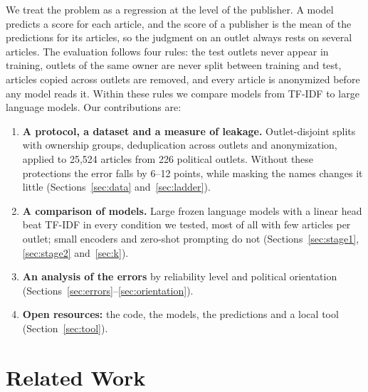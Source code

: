 \documentclass[11pt,a4paper]{article}
\begin{document}
We treat the problem as a regression at the level of the publisher. A model predicts a score for each article, and the
score of a publisher is the mean of the predictions for its articles, so the judgment on an outlet always rests on
several articles. The evaluation follows four rules: the test outlets never appear in training, outlets of the same
owner are never split between training and test, articles copied across outlets are removed, and every article is
anonymized before any model reads it. Within these rules we compare models from TF-IDF to large language models. Our
contributions are:
\begin{enumerate}
  \item \textbf{A protocol, a dataset and a measure of leakage.} Outlet-disjoint splits with ownership groups,
        deduplication across outlets and anonymization, applied to 25,524 articles from 226 political outlets. Without
        these protections the error falls by 6--12 points, while masking the names changes it little
        (Sections~\ref{sec:data} and~\ref{sec:ladder}).
  \item \textbf{A comparison of models.} Large frozen language models with a linear head beat TF-IDF in every condition
        we tested, most of all with few articles per outlet; small encoders and zero-shot prompting do not
        (Sections~\ref{sec:stage1}, \ref{sec:stage2} and~\ref{sec:k}).
  \item \textbf{An analysis of the errors} by reliability level and political orientation
        (Sections~\ref{sec:errors}--\ref{sec:orientation}).
  \item \textbf{Open resources:} the code, the models, the predictions and a local tool (Section~\ref{sec:tool}).
\end{enumerate}

\section{Related Work}\label{sec:related}
\end{document}
